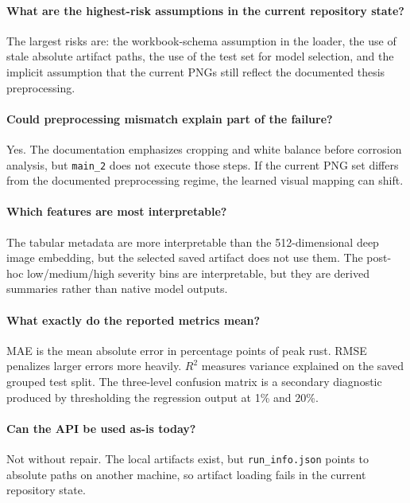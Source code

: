 \documentclass[11pt]{article}
\begin{document}
\paragraph{What are the highest-risk assumptions in the current repository state?}
The largest risks are: the workbook-schema assumption in the loader, the use of stale absolute artifact paths, the use of the test set for model selection, and the implicit assumption that the current PNGs still reflect the documented thesis preprocessing.

\paragraph{Could preprocessing mismatch explain part of the failure?}
Yes. The documentation emphasizes cropping and white balance before corrosion analysis, but \texttt{main\_2} does not execute those steps. If the current PNG set differs from the documented preprocessing regime, the learned visual mapping can shift.

\paragraph{Which features are most interpretable?}
The tabular metadata are more interpretable than the 512-dimensional deep image embedding, but the selected saved artifact does not use them. The post-hoc low/medium/high severity bins are interpretable, but they are derived summaries rather than native model outputs.

\paragraph{What exactly do the reported metrics mean?}
MAE is the mean absolute error in percentage points of peak rust. RMSE penalizes larger errors more heavily. \(R^2\) measures variance explained on the saved grouped test split. The three-level confusion matrix is a secondary diagnostic produced by thresholding the regression output at 1\% and 20\%.

\paragraph{Can the API be used as-is today?}
Not without repair. The local artifacts exist, but \texttt{run\_info.json} points to absolute paths on another machine, so artifact loading fails in the current repository state.
\end{document}
